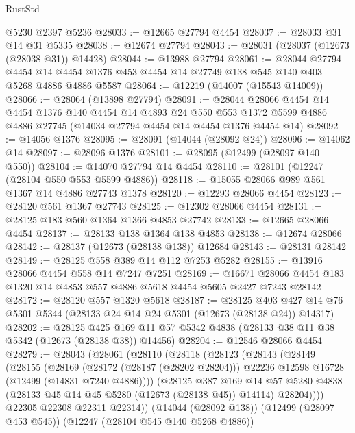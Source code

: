 \begin{lexlean}{RustStd}
\begin{coremodule}
{\begin{coremodule}
{{{{{{{{{{{{{{{{{{{{{{{{{{{{{{{{{{{{{{{{{{{{{{{{{{{{{{{{{{{{{{{{{{{{{{{{{{{{{{{{    @5230
    @2397
    @5236
@28033 := @12665 @27794 @4454
@28037 := @28033 @31 @14 @31 @5335
@28038 := @12674 @27794
@28043 := @28031 (@28037 (@12673 (@28038 @31)) @14428)
@28044 := @13988 @27794
@28061 := @28044
    @27794
    @4454
    @14
    @4454
    @1376
    @453
    @4454
    @14
    @27749
    @138
    @545
    @140
    @403
    @5268
    @4886
    @4886
    @5587
@28064 := @12219 (@14007 (@15543 @14009))
@28066 := @28064 (@13898 @27794)
@28091 := @28044
    @28066
    @4454
    @14
    @4454
    @1376
    @140
    @4454
    @14
    @4893
    @24
    @550
    @553
    @1372
    @5599
    @4886
    @4886
    @27745
    (@14034 @27794 @4454 @14 @4454 @1376 @4454 @14)
@28092 := @14056 @1376
@28095 := @28091 (@14044 (@28092 @24))
@28096 := @14062 @14
@28097 := @28096 @1376
@28101 := @28095 (@12499 (@28097 @140 @550))
@28104 := @14070 @27794 @14 @4454
@28110 := @28101 (@12247 (@28104 @550 @553 @5599 @4886))
@28118 := @15055 @28066 @989 @561 @1367 @14 @4886 @27743 @1378
@28120 := @12293 @28066 @4454
@28123 := @28120 @561 @1367 @27743
@28125 := @12302 @28066 @4454
@28131 := @28125 @183 @560 @1364 @1366 @4853 @27742
@28133 := @12665 @28066 @4454
@28137 := @28133 @138 @1364 @138 @4853
@28138 := @12674 @28066
@28142 := @28137 (@12673 (@28138 @138)) @12684
@28143 := @28131 @28142
@28149 := @28125 @558 @389 @14 @112 @7253 @5282
@28155 := @13916 @28066 @4454 @558 @14 @7247 @7251
@28169 := @16671 @28066 @4454 @183 @1320 @14 @4853 @557 @4886 @5618 @4454 @5605 @2427 @7243 @28142
@28172 := @28120 @557 @1320 @5618
@28187 := @28125
    @403
    @427
    @14
    @76
    @5301
    @5344
    (@28133 @24 @14 @24 @5301 (@12673 (@28138 @24)) @14317)
@28202 := @28125
    @425
    @169
    @11
    @57
    @5342
    @4838
    (@28133 @38 @11 @38 @5342 (@12673 (@28138 @38)) @14456)
@28204 := @12546 @28066 @4454
@28279 := @28043
    (@28061
      (@28110
        (@28118
          (@28123
            (@28143
              (@28149
                (@28155
                  (@28169
                    (@28172 (@28187 (@28202 @28204)))
                    @22236
                    @12598
                    @16728
                    (@12499 (@14831 @7240 @4886))))
                (@28125
                  @387
                  @169
                  @14
                  @57
                  @5280
                  @4838
                  (@28133 @45 @14 @45 @5280 (@12673 (@28138 @45)) @14114)
                  @28204))))
          @22305
          @22308
          @22311
          @22314))
      (@14044 (@28092 @138))
      (@12499 (@28097 @453 @545))
      (@12247 (@28104 @545 @140 @5268 @4886))
}}}}}}}}}}}}}}}}}}}}}}}}}}}}}}}}}}}}}}}}}}}}}}}}}}}}}}}}}}}}}}}}}}}}}}}}}}}}}}}}
\end{coremodule}}
\end{coremodule}
\end{lexlean}
